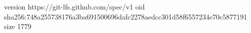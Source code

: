 version https://git-lfs.github.com/spec/v1
oid sha256:748a255738176a3ba691500696dafc2278aedcc301d58f6557234e70c5877191
size 1779
